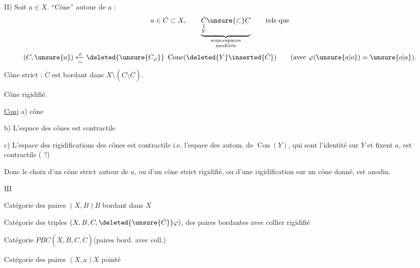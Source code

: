II) Soit $a\in X$. ``Cône'' autour de $a$ :
\[
a\in C\subset X,\qquad
\underbrace{\underset{\substack{\Vert\\Y}}{\dot C}\unsure{\subset}C}_{\substack{\text{sous-espaces}\\\text{modérés}}}
\qquad\text{tels que}
\]
\[
(C,\unsure{a})\xleftarrow[\sim]{\varphi}
\deleted{\unsure{C_\varphi}}\ \operatorname{Cone}(\deleted{Y}\inserted{\dot C})
\qquad(\text{avec }\varphi(\unsure{a|o})=\unsure{o|a}).
\]
Cône strict : $\dot C$ est bordant dans $X\setminus(C\setminus\dot C)$.

Cône rigidifié.

\uline{Conj} a)  cône

b) L'espace des cônes  est contractile

c) L'espace des rigidifications des
cônes est contractile i.e. l'espace
des autom. de $\operatorname{Con}(Y)$, qui sont
l'identité sur $Y$ et fixent $a$,
est contractile ( ?)

Donc le choix d'un cône strict autour
de $a$, ou d'un cône strict rigidifié,
ou d'une  rigidification sur un
cône donné, est anodin.

$\overline{\underline{\mathrm{III}}}$

Catégorie  des paires $(X,B)$\quad $B$ bordant dans $X$

Catégorie  des  triples
$(X,B,C,\deleted{\unsure{\dot C}}\varphi)$, des
paires bordantes avec collier  rigidifié

Catégorie $PBC$\quad $(X,B,C,\dot C)$\quad (paires bord. avec coll.)

Catégorie  des paires $(X,a)$\quad $X$ pointé
